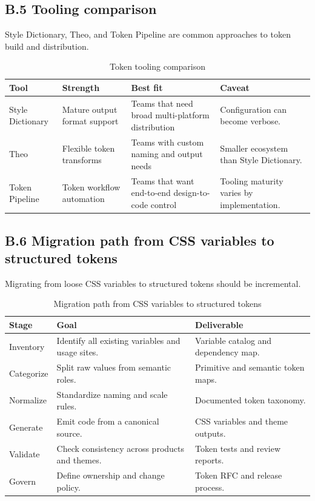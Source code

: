 \subsection*{B.5 Tooling comparison}
Style Dictionary, Theo, and Token Pipeline are common approaches to token build and distribution.

\begin{table}[htbp]
  \centering
  \caption{Token tooling comparison}
  \begin{tabularx}{\textwidth}{@{}p{}p{}p{}Y@{}}
    \toprule
    \textbf{Tool} & \textbf{Strength} & \textbf{Best fit} & \textbf{Caveat} \\
    \midrule
    Style Dictionary & Mature output format support & Teams that need broad multi-platform distribution & Configuration can become verbose. \\
    Theo & Flexible token transforms & Teams with custom naming and output needs & Smaller ecosystem than Style Dictionary. \\
    Token Pipeline & Token workflow automation & Teams that want end-to-end design-to-code control & Tooling maturity varies by implementation. \\
    \bottomrule
  \end{tabularx}
\end{table}

\subsection*{B.6 Migration path from CSS variables to structured tokens}
Migrating from loose CSS variables to structured tokens should be incremental.

\begin{table}[htbp]
  \centering
  \caption{Migration path from CSS variables to structured tokens}
  \begin{tabularx}{\textwidth}{@{}p{}p{}Y@{}}
    \toprule
    \textbf{Stage} & \textbf{Goal} & \textbf{Deliverable} \\
    \midrule
    Inventory & Identify all existing variables and usage sites. & Variable catalog and dependency map. \\
    Categorize & Split raw values from semantic roles. & Primitive and semantic token maps. \\
    Normalize & Standardize naming and scale rules. & Documented token taxonomy. \\
    Generate & Emit code from a canonical source. & CSS variables and theme outputs. \\
    Validate & Check consistency across products and themes. & Token tests and review reports. \\
    Govern & Define ownership and change policy. & Token RFC and release process. \\
    \bottomrule
  \end{tabularx}
\end{table}

